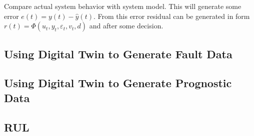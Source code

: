 \documentclass[class=article, crop=false]{standalone}
\begin{document}
Compare actual system behavior with system model. This will generate some
error $e(t) = y(t) - \hat{y}(t)$. From this error residual can be generated
in form $r(t)=\Phi(u_t,y_t, \varepsilon_t,v_t,d)$ and after some decision.

\subsection{Using Digital Twin to Generate Fault Data}

\subsection{Using Digital Twin to Generate Prognostic Data}

\subsection{RUL}
\end{document}
